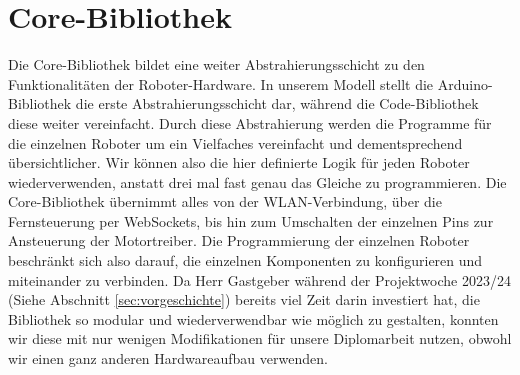 \section{Core-Bibliothek}
\label{subec:robots_core}
Die Core-Bibliothek bildet eine weiter Abstrahierungsschicht zu den Funktionalitäten der Roboter-Hardware.
%
In unserem Modell stellt die Arduino-Bibliothek die erste Abstrahierungsschicht dar,
während die Code-Bibliothek diese weiter vereinfacht.
%
Durch diese Abstrahierung werden die Programme für die einzelnen Roboter um ein Vielfaches vereinfacht und dementsprechend übersichtlicher.
%
Wir können also die hier definierte Logik für jeden Roboter wiederverwenden,
anstatt drei mal fast genau das Gleiche zu programmieren.
%
Die Core-Bibliothek übernimmt alles von der WLAN-Verbindung,
über die Fernsteuerung per WebSockets,
bis hin zum Umschalten der einzelnen Pins zur Ansteuerung der Motortreiber.
%
Die Programmierung der einzelnen Roboter beschränkt sich also darauf,
die einzelnen Komponenten zu konfigurieren und miteinander zu verbinden.
%
Da Herr Gastgeber während der Projektwoche 2023/24 (Siehe Abschnitt \ref{sec:vorgeschichte}) bereits viel Zeit darin investiert hat,
die Bibliothek so modular und wiederverwendbar wie möglich zu gestalten,
konnten wir diese mit nur wenigen Modifikationen für unsere Diplomarbeit nutzen,
obwohl wir einen ganz anderen Hardwareaufbau verwenden.

